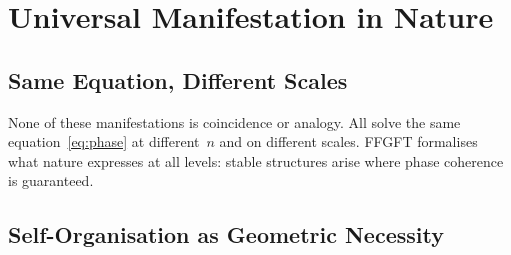 \section{Universal Manifestation in Nature}

\subsection{Same Equation, Different Scales}

\begin{table}[H]
\centering
\caption{Manifestation of the phase condition on different scales}
\smallskip
{}
\end{table}

\begin{keybox}
None of these manifestations is coincidence or analogy. All solve
the same equation~\eqref{eq:phase} at different~$n$ and on different
scales. FFGFT formalises what nature expresses at all levels: stable
structures arise where phase coherence is guaranteed.
\end{keybox}

\subsection{Self-Organisation as Geometric Necessity}


